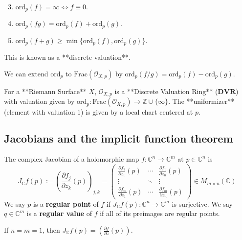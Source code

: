 \documentclass{article}
\begin{document}
\begin{enumerate}
    \setcounter{enumi}{2} %
    \item $\text{ord}_p(f) = \infty \iff f \equiv 0$.
    \item $\text{ord}_p(f g) = \text{ord}_p(f) + \text{ord}_p(g)$.
    \item $\text{ord}_p(f+g) \geq \min \{\text{ord}_p(f), \text{ord}_p(g)\}$.
\end{enumerate}
This is known as a **discrete valuation**.

We can extend $\text{ord}_p$ to $\text{Frac}(\mathcal{O}_{X, p})$ by $\text{ord}_p(f/g) = \text{ord}_p(f) - \text{ord}_p(g)$.

\begin{lemma}
For a **Riemann Surface** $X$, $\mathcal{O}_{X, p}$ is a **Discrete Valuation Ring** ($\mathbf{DVR}$) with valuation given by $\text{ord}_p: \text{Frac}(\mathcal{O}_{X, p}) \to \mathbb{Z} \cup \{\infty\}$.
The **uniformizer** (element with valuation 1) is given by a local chart centered at $p$.
\end{lemma}

\subsection{Jacobians and the implicit function theorem}

\begin{definition}
The complex Jacobian of a holomorphic map $f: \mathbb{C}^n \to \mathbb{C}^m$ at $p \in \mathbb{C}^n$ is
$$
J_{\mathbb{C}} f(p) := \left( \frac{\partial f_j}{\partial z_k} (p) \right)_{j, k} = \begin{pmatrix}
\frac{\partial f_1}{\partial z_1} (p) & \cdots & \frac{\partial f_1}{\partial z_n} (p) \\
\vdots & \ddots & \vdots \\
\frac{\partial f_m}{\partial z_1} (p) & \cdots & \frac{\partial f_m}{\partial z_n} (p)
\end{pmatrix} \in M_{m \times n} (\mathbb{C})
$$
We say $p$ is a \textbf{regular point} of $f$ if $J_{\mathbb{C}} f(p): \mathbb{C}^n \to \mathbb{C}^m$ is surjective.
We say $q \in \mathbb{C}^m$ is a \textbf{regular value} of $f$ if all of its preimages are regular points.
\end{definition}

\begin{example}
If $n=m=1$, then $J_{\mathbb{C}} f(p) = \left( \frac{\partial f}{\partial z} (p) \right)$.
\end{example}
\end{document}
